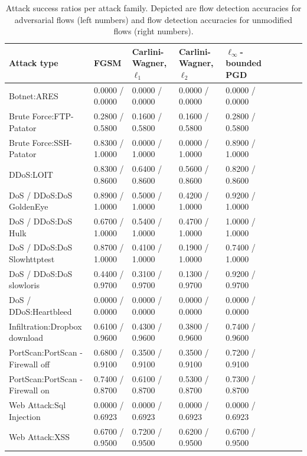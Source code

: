 \documentclass[sigconf,nonacm]{acmart}
\begin{document}
\begin{table}
\caption{Attack success ratios per attack family. Depicted are flow detection accuracies for adversarial flows (left numbers) and flow detection accuracies for unmodified flows (right numbers).}
\label{tab:adv_per_family}
\begin{tabular}{lllllllll}
\toprule
Attack type & FGSM & Carlini-Wagner, $\ell_1$ & Carlini-Wagner, $\ell_2$ & $\ell_\infty$-bounded PGD \\
\midrule
Botnet:ARES	&	0.0000 / 0.0000	&	0.0000 / 0.0000	&	0.0000 / 0.0000	&	0.0000 / 0.0000	\\
Brute Force:FTP-Patator	&	0.2800 / 0.5800	&	0.1600 / 0.5800	&	0.1600 / 0.5800	&	0.2800 / 0.5800	\\
Brute Force:SSH-Patator	&	0.8300 / 1.0000	&	0.0000 / 1.0000	&	0.0000 / 1.0000	&	0.8900 / 1.0000	\\
DDoS:LOIT	&	0.8300 / 0.8600	&	0.6400 / 0.8600	&	0.5600 / 0.8600	&	0.8200 / 0.8600	\\
DoS / DDoS:DoS GoldenEye	&	0.8900 / 1.0000	&	0.5000 / 1.0000	&	0.4200 / 1.0000	&	0.9200 / 1.0000	\\
DoS / DDoS:DoS Hulk	&	0.6700 / 1.0000	&	0.5400 / 1.0000	&	0.4700 / 1.0000	&	1.0000 / 1.0000	\\
DoS / DDoS:DoS Slowhttptest	&	0.8700 / 1.0000	&	0.4100 / 1.0000	&	0.1900 / 1.0000	&	0.7400 / 1.0000	\\
DoS / DDoS:DoS slowloris	&	0.4400 / 0.9700	&	0.3100 / 0.9700	&	0.1300 / 0.9700	&	0.9200 / 0.9700	\\
DoS / DDoS:Heartbleed	&	0.0000 / 0.0000	&	0.0000 / 0.0000	&	0.0000 / 0.0000	&	0.0000 / 0.0000	\\
Infiltration:Dropbox download 	&	0.6100 / 0.9600	&	0.4300 / 0.9600	&	0.3800 / 0.9600	&	0.7400 / 0.9600	\\
PortScan:PortScan - Firewall off	&	0.6800 / 0.9100	&	0.3500 / 0.9100	&	0.3500 / 0.9100	&	0.7200 / 0.9100	\\
PortScan:PortScan - Firewall on	&	0.7400 / 0.8700	&	0.6100 / 0.8700	&	0.5300 / 0.8700	&	0.7300 / 0.8700	\\
Web Attack:Sql Injection	&	0.0000 / 0.6923	&	0.0000 / 0.6923	&	0.0000 / 0.6923	&	0.0000 / 0.6923	\\
Web Attack:XSS	&	0.6700 / 0.9500	&	0.7200 / 0.9500	&	0.6200 / 0.9500	&	0.6700 / 0.9500	\\
\bottomrule

\end{tabular}
\end{table}
\end{document}
